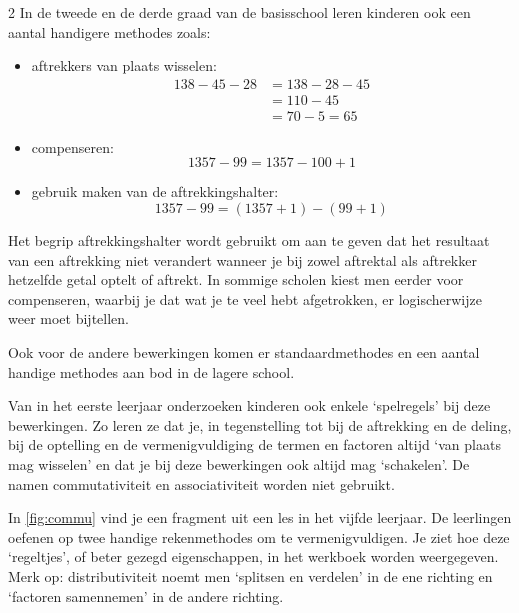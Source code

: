 \begin{multicols}{2}
In de tweede en de derde graad van de basisschool leren kinderen ook een aantal handigere methodes zoals:
\begin{itemize}
    \item aftrekkers van plaats wisselen:
\begin{align*}
    138 - 45 - 28 &= 138 - 28 - 45 \\
    &= 110 - 45 \\
    &= 70 - 5 = 65 
\end{align*}

    \item  compenseren:
\[
    1357 - 99 = 1357 - 100 +1
\]
    \item gebruik maken van de aftrekkingshalter:
\[
    1357 - 99 = (1357 + 1) - (99 + 1)
\]
\end{itemize}
Het begrip aftrekkingshalter wordt gebruikt om aan te geven dat het resultaat van een aftrekking niet verandert wanneer je bij zowel aftrektal als aftrekker hetzelfde getal optelt of aftrekt.
In sommige scholen kiest men eerder voor compenseren, waarbij je dat wat je te veel hebt afgetrokken, er logischerwijze weer moet bijtellen.

Ook voor de andere bewerkingen komen er standaardmethodes en een aantal handige methodes aan bod in de lagere school.

Van in het eerste leerjaar onderzoeken kinderen ook enkele `spelregels' bij deze bewerkingen.
Zo leren ze dat je, in tegenstelling tot bij de aftrekking en de deling, bij de optelling en de vermenigvuldiging de termen en factoren altijd `van plaats mag wisselen' en dat je bij deze bewerkingen ook altijd mag `schakelen'. 
De namen commutativiteit en associativiteit worden niet gebruikt.

In \autoref{fig:commu} vind je een fragment uit een les in het vijfde leerjaar.
De leerlingen oefenen op twee handige rekenmethodes om te vermenigvuldigen.
Je ziet hoe deze `regeltjes', of beter gezegd eigenschappen, in het werkboek worden weergegeven.
Merk op: distributiviteit noemt men `splitsen en verdelen' in de ene richting en `factoren samennemen' in de andere richting.

\end{multicols}

